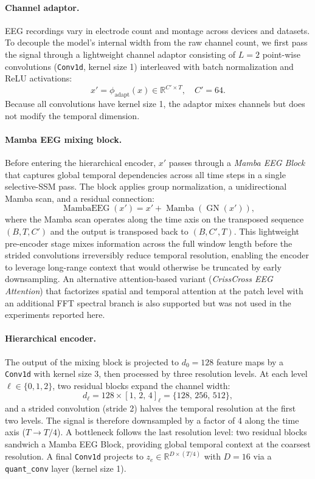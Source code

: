 \documentclass{article}
\begin{document}
\paragraph{Channel adaptor.}
EEG recordings vary in electrode count and montage across devices and datasets.
To decouple the model's internal width from the raw channel count, we first pass the signal through a lightweight channel adaptor consisting of $L=2$ point-wise convolutions (\texttt{Conv1d}, kernel size 1) interleaved with batch normalization and ReLU activations:
\begin{equation}
  x' = \phi_{\mathrm{adapt}}(x) \in \mathbb{R}^{C' \times T}, \quad C' = 64.
\end{equation}
Because all convolutions have kernel size 1, the adaptor mixes channels but does not modify the temporal dimension.

\paragraph{Mamba EEG mixing block.}
Before entering the hierarchical encoder, $x'$ passes through a \emph{Mamba EEG Block} that captures global temporal dependencies across all time steps in a single selective-SSM pass.
The block applies group normalization, a unidirectional Mamba scan, and a residual connection:
\begin{equation}
  \operatorname{MambaEEG}(x') = x' + \operatorname{Mamba}(\operatorname{GN}(x')),
\end{equation}
where the Mamba scan operates along the time axis on the transposed sequence $(B, T, C')$ and the output is transposed back to $(B, C', T)$.
This lightweight pre-encoder stage mixes information across the full window length before the strided convolutions irreversibly reduce temporal resolution, enabling the encoder to leverage long-range context that would otherwise be truncated by early downsampling.
An alternative attention-based variant (\emph{CrissCross EEG Attention}) that factorizes spatial and temporal attention at the patch level with an additional FFT spectral branch is also supported but was not used in the experiments reported here.

\paragraph{Hierarchical encoder.}
The output of the mixing block is projected to $d_0 = 128$ feature maps by a \texttt{Conv1d} with kernel size 3, then processed by three resolution levels.
At each level $\ell \in \{0, 1, 2\}$, two residual blocks expand the channel width:
\begin{equation}
  d_\ell = 128 \times [1,\, 2,\, 4]_\ell = \{128,\, 256,\, 512\},
\end{equation}
and a strided convolution (stride 2) halves the temporal resolution at the first two levels.
The signal is therefore downsampled by a factor of 4 along the time axis ($T \to T/4$).
A bottleneck follows the last resolution level: two residual blocks sandwich a Mamba EEG Block, providing global temporal context at the coarsest resolution.
A final \texttt{Conv1d} projects to $z_e \in \mathbb{R}^{D \times (T/4)}$ with $D = 16$ via a \texttt{quant\_conv} layer (kernel size 1).
\end{document}

